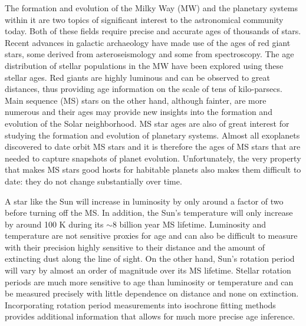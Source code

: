 

The formation and evolution of the Milky Way (MW) and the planetary systems
within it are two topics of significant interest to the astronomical community
today.
Both of these fields require precise and accurate ages of thousands of stars.
Recent advances in galactic archaeology have made use of the ages of red giant
stars, some derived from asteroseismology and some from spectroscopy.
The age distribution of stellar populations in the MW have been explored using
these stellar ages.
Red giants are highly luminous and can be observed to great distances, thus
providing age information on the scale of tens of kilo-parsecs.
Main sequence (MS) stars on the other hand, although fainter, are more
numerous and their ages may provide new insights into the formation and
evolution of the Solar neighborhood.
MS star ages are also of great interest for studying the formation and
evolution of planetary systems.
Almost all exoplanets discovered to date orbit MS stars and it is therefore
the ages of MS stars that are needed to capture snapshots of planet evolution.
Unfortunately, the very property that makes MS stars good hosts for habitable
planets also makes them difficult to date: they do not change substantially
over time.

A star like the Sun will increase in luminosity by only around a factor of two
before turning off the MS.
In addition, the Sun's temperature will only increase by around 100 K during
its $\sim$8 billion year MS lifetime.
Luminosity and temperature are not sensitive proxies for age and can also be
difficult to measure with their precision highly sensitive to their distance
and the amount of extincting dust along the line of sight.
On the other hand, Sun's rotation period will vary by almost an order of
magnitude over its MS lifetime.
Stellar rotation periods are much more sensitive to age than luminosity or
temperature and can be measured precisely with little dependence on distance
and none on extinction.
Incorporating rotation period measurements into isochrone fitting methods
provides additional information that allows for much more precise age
inference.


